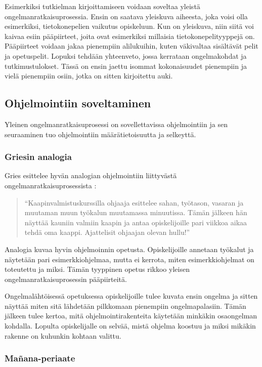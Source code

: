 Esimerkiksi tutkielman kirjoittamiseen voidaan soveltaa yleistä
ongelmanratkaisuprosessia. Ensin on saatava yleiskuva aiheesta, joka voisi olla
esimerkiksi, tietokonepelien vaikutus opiskeluun. Kun on yleiskuva, niin siitä
voi kaivaa esiin pääpiirteet, joita ovat esimerkiksi millaisia
tietokonepelityyppejä on. Pääpiirteet voidaan jakaa pienempiin alilukuihin,
kuten väkivaltaa sisältävät pelit ja opetuspelit. Lopuksi tehdään yhteenveto,
jossa kerrataan ongelmakohdat ja tutkimustulokset. Tässä on ensin jaettu isommat
kokonaisuudet pienempiin ja vielä pienempiin osiin, jotka on sitten kirjoitettu
auki.

\subsection{Ohjelmointiin soveltaminen}

Yleinen ongelmanratkaisuprosessi on sovellettavissa ohjelmointiin ja sen
seuraaminen tuo ohjelmointiin määrätietoisuutta ja selkeyttä.

\subsubsection{Griesin analogia}

Gries esittelee hyvän analogian ohjelmointiin liittyvästä
ongelmanratkaisuprosessista \cite{Gries:1974:WTI:953057.810447}:

\begin{quotation}
``Kaapinvalmistuskurssilla ohjaaja esittelee sahan, työtason, vasaran ja
muutaman muun työkalun muutamassa minuutissa. Tämän jälkeen hän näyttää
kauniin valmiin kaapin ja antaa opiskelijoille pari viikkoa aikaa tehdä oma
kaappi. Ajattelisit ohjaajan olevan hullu!''
\end{quotation}

Analogia kuvaa hyvin ohjelmoinnin opetusta. Opiskelijoille annetaan työkalut ja
näytetään pari esimerkkiohjelmaa, mutta ei kerrota, miten esimerkkiohjelmat on
toteutettu ja miksi. Tämän tyyppinen opetus rikkoo yleisen
ongelmanratkaisuprosessin pääpiirteitä.

Ongelmalähtöisessä opetuksessa opiskelijoille tulee kuvata ensin ongelma ja
sitten näyttää miten sitä lähdetään pilkkomaan pienempiin ongelmapalasiin. Tämän
jälkeen tulee kertoa, mitä ohjelmointirakenteita käytetään minkäkin osaongelman
kohdalla. Lopulta opiskelijalle on selvää, mistä ohjelma koostuu ja miksi
mikäkin rakenne on kuhunkin kohtaan valittu.

\subsubsection{Mañana-periaate}

